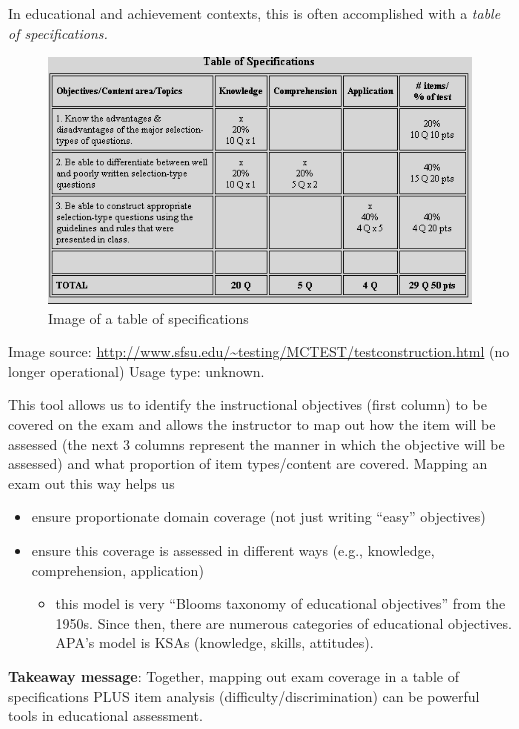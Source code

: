 \documentclass[
  english,
]{book}
\providecommand{\tightlist}{%
  \setlength{\itemsep}{0pt}\setlength{\parskip}{0pt}}
\begin{document}
In educational and achievement contexts, this is often accomplished with a \emph{table of specifications.}

\begin{figure}
\centering
\includegraphics{images/ItemAnalExam/SpecsTableNewBG.png}
\caption{Image of a table of specifications}
\end{figure}

Image source: \url{http://www.sfsu.edu/~testing/MCTEST/testconstruction.html} (no longer operational) Usage type: unknown.

This tool allows us to identify the instructional objectives (first column) to be covered on the exam and allows the instructor to map out how the item will be assessed (the next 3 columns represent the manner in which the objective will be assessed) and what proportion of item types/content are covered. Mapping an exam out this way helps us

\begin{itemize}
\tightlist
\item
  ensure proportionate domain coverage (not just writing ``easy'' objectives)
\item
  ensure this coverage is assessed in different ways (e.g., knowledge, comprehension, application)

  \begin{itemize}
  \tightlist
  \item
    this model is very ``Blooms taxonomy of educational objectives'' from the 1950s. Since then, there are numerous categories of educational objectives. APA's model is KSAs (knowledge, skills, attitudes).
  \end{itemize}
\end{itemize}

\textbf{Takeaway message}: Together, mapping out exam coverage in a table of specifications PLUS item analysis (difficulty/discrimination) can be powerful tools in educational assessment.
\end{document}
